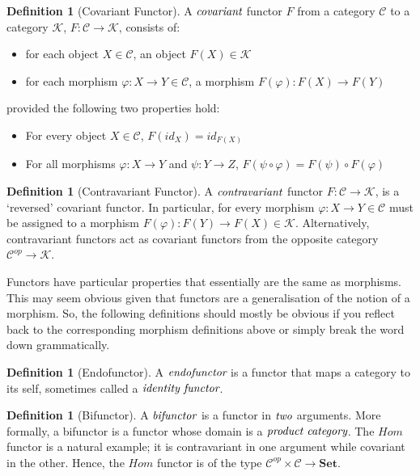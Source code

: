 \documentclass[10pt, oneside, reqno]{amsart}
\theoremstyle{plain}%
\theoremstyle{definition}
\newtheorem{defn}[thm]{Definition}
\theoremstyle{remark}
\newcommand{\Id}{\mathit{id}_}
\begin{document}
\begin{defn}[Covariant Functor]
 A $\emph{covariant}$ functor $F$ from a category $\mathcal{C}$ to a category $\mathcal{K}$, $F: \mathcal{C} \to \mathcal{K}$, consists of:
 \begin{itemize}
  \item for each object $X \in \mathcal{C}$, an object $F(X) \in \mathcal{K}$
  \item for each morphism $\varphi: X \to Y \in \mathcal{C}$, a morphism $F(\varphi): F(X) \to F(Y)$
 \end{itemize}
 provided the following two properties hold:
 \begin{itemize}
  \item For every object $X \in \mathcal{C}$, $F(\Id{X}) = \Id{F(X)}$
  \item For all morphisms $\varphi: X \to Y$ and $\psi: Y \to Z$, $F(\psi \circ \varphi) = F(\psi) \circ F(\varphi)$
 \end{itemize}
\end{defn}

\begin{defn}[Contravariant Functor]
 A $\emph{contravariant}$ functor $F: \mathcal{C} \to \mathcal{K}$, is a `reversed' covariant functor.
 In particular, for every morphism $\varphi: X \to Y \in \mathcal{C}$ must be assigned to a morphism $F(\varphi): F(Y) \to F(X) \in \mathcal{K}$.
 Alternatively, contravariant functors act as covariant functors from the opposite category $\mathcal{C}^{op} \to \mathcal{K}$.
\end{defn}

Functors have particular properties that essentially are the same as morphisms.
This may seem obvious given that functors are a generalisation of the notion of a morphism.
So, the following definitions should mostly be obvious if you reflect back to the corresponding morphism
definitions above or simply break the word down grammatically.

\begin{defn}[Endofunctor]
 A $\emph{endofunctor}$ is a functor that maps a category to its self, sometimes called a $\emph{identity functor}$.
\end{defn}

\begin{defn}[Bifunctor]
 A $\emph{bifunctor}$ is a functor in $\emph{two}$ arguments. More formally, a bifunctor is a functor whose
 domain is a $\emph{product category}$.
 The $Hom$ functor is a natural example; it is contravariant in one argument while covariant in the other.
 Hence, the $Hom$ functor is of the type $\mathcal{C}^{op} \times \mathcal{C} \to \textbf{Set}$.
\end{defn}
\end{document}
